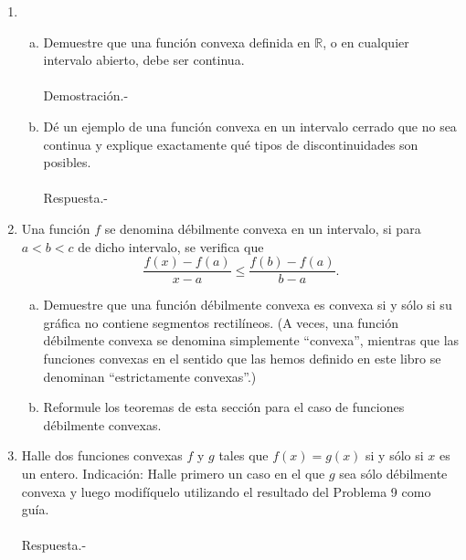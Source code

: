 \begin{enumerate}[\bfseries 1.]
\begin{enumerate}[(a)]
	\end{enumerate}


    \item
	\begin{enumerate}[a)]

	    \item Demuestre que una función convexa definida en $\mathbb{R}$, o en cualquier intervalo abierto, debe ser continua.\\\\
		Demostración.-\; 

	    \item Dé un ejemplo de una función convexa en un intervalo cerrado que no sea continua y explique exactamente qué tipos de discontinuidades son posibles. \\\\
		Respuesta.-\; 

	\end{enumerate}

    \item Una función $f$ se denomina débilmente convexa en un intervalo, si para $a < b < c$ de dicho intervalo, se verifica que 
    $$\dfrac{f(x)-f(a)}{x-a}\leq \dfrac{f(b)-f(a)}{b-a}.$$

	\begin{enumerate}[(a)]

	    \item Demuestre que una función débilmente convexa es convexa si y sólo si su gráfica no contiene segmentos rectilíneos. (A veces, una función débilmente convexa se denomina simplemente “convexa”, mientras que las funciones convexas en el sentido que las hemos definido en este libro se denominan “estrictamente convexas”.)

	    \item Reformule los teoremas de esta sección para el caso de funciones débilmente convexas.

	\end{enumerate}

    \item Halle dos funciones convexas $f$ y $g$ tales que $f(x) = g(x)$ si y sólo si $x$ es un entero. Indicación: Halle primero un caso en el que $g$ sea sólo débilmente convexa y luego modifíquelo utilizando el resultado del Problema 9 como guía.\\\\
	Respuesta.-\; 


\end{enumerate}
